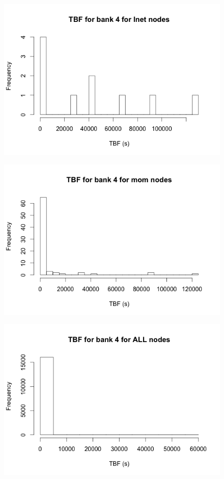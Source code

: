 \begin{figure}[h]
\centering
\includegraphics{images/tbf_4_l.png}
\end{figure}

\begin{figure}[h]
\centering
\includegraphics{images/tbf_4_m.png}
\end{figure}

\begin{figure}[h]
\centering
\includegraphics{images/tbf_4_a.png}
\end{figure}

